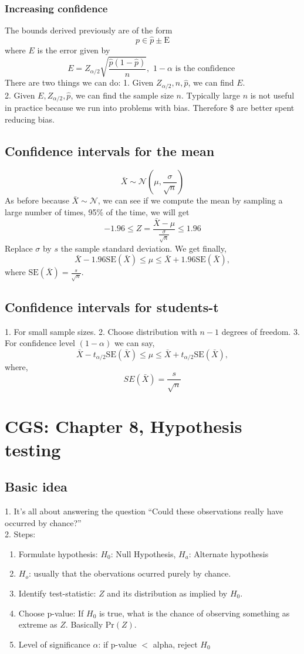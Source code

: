 \documentclass{article}
\newcommand{\beq}{\begin{equation}}
\newcommand{\eeq}{\end{equation}}
\begin{document}
\subsubsection{Increasing confidence}
The bounds derived previously are of the form
\beq
p \in \hat{p} \pm \text{E}
\eeq
where $E$ is the error given by
\beq
E = Z_{\alpha/2}\sqrt{\frac{\hat{p}(1-\hat{p})}{n}}, \,\, 1-\alpha \text{ is the confidence }
\eeq
There are two things we can do:
1. Given $Z_{\alpha/2},n,\hat{p}$, we can find $E$.\\
2. Given $E,Z_{\alpha/2},\hat{p}$, we can find the sample size $n$.
Typically large $n$ is not useful in practice because we run into problems with bias. Therefore \$ are better spent reducing bias.
\subsection{Confidence intervals for the mean}
\beq
\bar{X} \sim \mathcal{N}(\mu,\frac{\sigma}{\sqrt{n}})
\eeq
As before because $\bar{X}\sim\mathcal{N}$, we can see if we compute the mean by sampling a large number of times, 95\% of the time, we will get
\beq
-1.96 \le Z=\frac{\bar{X}-\mu}{\frac{\sigma}{\sqrt{n}}} \le 1.96
\eeq
Replace $\sigma$ by $s$ the sample standard deviation. We get finally,
\beq
\bar{X} - 1.96\text{SE}(\bar{X}) \le \mu \le \bar{X} + 1.96\text{SE}(\bar{X}),
\eeq
where $\text{SE}(\bar{X})=\frac{s}{\sqrt{n}}$.
\subsection{Confidence intervals for students-t}
1. For small sample sizes.
2. Choose distribution with $n-1$ degrees of freedom.
3. For confidence level $(1-\alpha)$ we can say,
\beq
\bar{X} - t_{\alpha/2}\text{SE}(\bar{X}) \le \mu \le \bar{X} + t_{\alpha/2}\text{SE}(\bar{X}),
\eeq
where,
\beq
SE(\bar{X}) = \frac{s}{\sqrt{n}}
\eeq
\section{CGS: Chapter 8, Hypothesis testing}
\subsection{Basic idea}
1. It's all about answering the question ``Could these observations really have occurred by chance?'' \\
2. Steps:
\begin{enumerate}
\item{Formulate hypothesis: $H_0$: Null Hypothesis, $H_a$: Alternate hypothesis}
\item{$H_o$: usually that the obervations ocurred purely by chance.}
\item{Identify test-statistic: $Z$ and its distribution as implied by $H_0$.}
\item{Choose p-value: If $H_0$ is true, what is the chance of observing something as extreme as $Z$. Basically Pr$(Z)$.}
\item{Level of significance $\alpha$: if p-value $<$ alpha, reject $H_0$}  
\end{enumerate}
\end{document}
